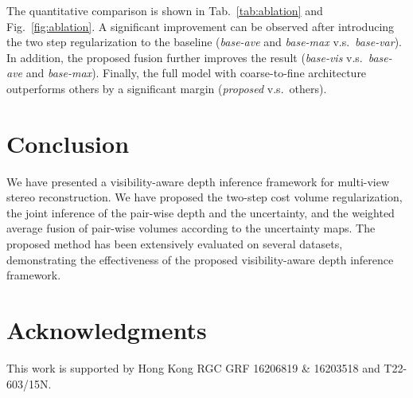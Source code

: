 \documentclass{bmvc2k}
\begin{document}
The quantitative comparison is shown in Tab.\ \ref{tab:ablation} and Fig.\ \ref{fig:ablation}. A significant improvement can be observed after introducing the two step regularization to the baseline (\textit{base-ave} and \textit{base-max} v.s.\ \textit{base-var}). In addition, the proposed fusion further improves the result (\textit{base-vis} v.s.\ \textit{base-ave} and \textit{base-max}). Finally, the full model with coarse-to-fine architecture outperforms others by a significant margin (\textit{proposed} v.s.\ others).








\section{Conclusion}
We have presented a visibility-aware depth inference framework for multi-view stereo reconstruction. We have proposed the two-step cost volume regularization, the joint inference of the pair-wise depth and the uncertainty, and the weighted average fusion of pair-wise volumes according to the uncertainty maps. The proposed method has been extensively evaluated on several datasets,  demonstrating the effectiveness of the proposed visibility-aware depth inference framework.

\section{Acknowledgments}
This work is supported by Hong Kong RGC GRF 16206819 \& 16203518 and T22-603/15N.


\end{document}
